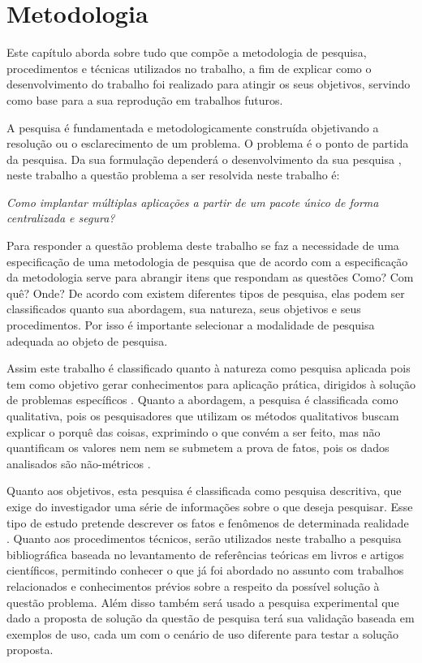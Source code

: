 \chapter{Metodologia}
\label{cap-metodologia}
Este capítulo aborda sobre tudo que compõe a metodologia de pesquisa,
procedimentos e técnicas utilizados no trabalho, a fim de
explicar como o desenvolvimento do trabalho foi realizado para atingir os seus objetivos,
servindo como base para a sua reprodução em trabalhos futuros.

A pesquisa é fundamentada e metodologicamente construída objetivando a resolução
ou o esclarecimento de um problema. O problema é o ponto de partida da pesquisa.
Da sua formulação dependerá o desenvolvimento da sua pesquisa
\cite{moresi2003metodologia}, neste trabalho a questão problema a ser resolvida neste trabalho é:

\begin{center}
  \textit{
  Como implantar múltiplas aplicações a partir de um pacote único
  de forma centralizada e segura?
}
\end{center}

Para responder a questão problema deste trabalho se faz a necessidade de uma especificação
de uma metodologia de pesquisa que de acordo com \cite{marconi2002tecnicas} a
especificação da metodologia serve para abrangir itens que respondam as questões
Como? Com quê? Onde? De acordo com \cite{gerhardt2009metodos} existem diferentes tipos de pesquisa,
elas podem ser classificados quanto sua abordagem, sua natureza, seus objetivos e
seus procedimentos. Por isso é importante selecionar a modalidade de pesquisa
adequada ao objeto de pesquisa.

Assim este trabalho é classificado quanto à natureza como pesquisa aplicada
pois tem como objetivo gerar conhecimentos para aplicação prática, dirigidos à
solução de problemas específicos \cite{gerhardt2009metodos}. Quanto a abordagem,
a pesquisa é classificada como qualitativa, pois os pesquisadores que utilizam os
métodos qualitativos buscam explicar o porquê das coisas, exprimindo o que convém
a ser feito, mas não quantificam os valores nem nem se submetem a prova de fatos,
pois os dados analisados são não-métricos \cite{gerhardt2009metodos}.

Quanto aos objetivos, esta pesquisa é classificada como pesquisa descritiva, que
exige do investigador uma série de informações sobre o que deseja pesquisar.
Esse tipo de estudo pretende descrever os fatos e fenômenos de determinada realidade
\cite{trivinos1987introduccao}. Quanto aos procedimentos técnicos, serão utilizados
neste trabalho a pesquisa bibliográfica baseada no levantamento de referências
teóricas em livros e artigos científicos, permitindo conhecer o que já foi abordado
no assunto com trabalhos relacionados e conhecimentos prévios sobre a respeito da
possível solução à questão problema. Além disso também será usado a pesquisa
experimental que dado a proposta de solução da questão de pesquisa terá sua
validação baseada em exemplos de uso, cada um com o cenário de uso diferente para
testar a solução proposta.

